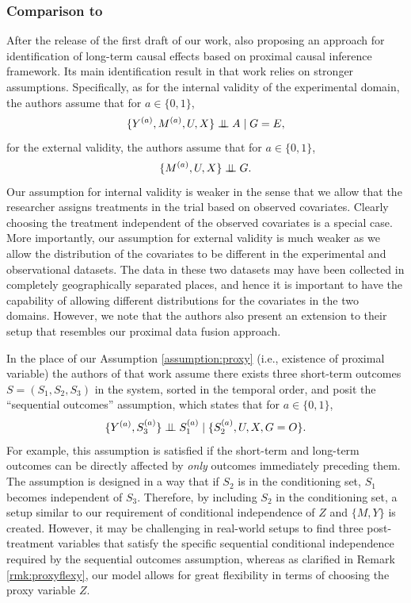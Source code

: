 \documentclass[10pt]{article}
\newcommand{\independent}{\perp\mkern-9.5mu\perp}
\begin{document}
\subsubsection{Comparison to \citep{imbens2022long}}
\label{sec:comImbens}

After the release of the first draft of our work, \cite{imbens2022long} also proposing an approach for identification of long-term causal effects based on proximal causal inference framework. Its main identification result in that work relies on stronger assumptions. Specifically, as for the internal validity of the experimental domain, the authors assume that for $a\in\{0,1\}$,
\[
\{Y^{(a)},M^{(a)},U,X\}\independent A\mid G=E,
\]
for the external validity, the authors assume that for $a\in\{0,1\}$,
\[
\{M^{(a)},U,X\}\independent G.
\]
Our assumption for internal validity is weaker in the sense that we allow that the researcher assigns treatments in the trial based on observed covariates. Clearly choosing the treatment independent of the observed covariates is a special case.
More importantly, our assumption for external validity is much weaker as we allow the distribution of the covariates to be different in the experimental and observational datasets. The data in these two datasets may have been collected in completely geographically separated places, and hence it is important to have the capability of allowing different distributions for the covariates in the two domains. 
However, we note that the authors also present an extension to their setup that resembles our proximal data fusion approach.  

In the place of our Assumption \ref{assumption:proxy} (i.e., existence of proximal variable) the authors of that work assume there exists three short-term outcomes $S=(S_1,S_2,S_3)$ in the system, sorted in the temporal order, and posit the ``sequential outcomes'' assumption, which states that for $a\in\{0,1\}$,
\[
\{Y^{(a)},S_3^{(a)}\}\independent S_1^{(a)}\mid \{S_2^{(a)},U,X,G=O\}.
\]
For example, this assumption is satisfied if the short-term and long-term outcomes can be directly affected by \emph{only} outcomes immediately preceding them.
The assumption is designed in a way that if $S_2$ is in the conditioning set, $S_1$ becomes independent of $S_3$. Therefore, by including $S_2$ in the conditioning set, a setup similar to our requirement of conditional independence of $Z$ and $\{M,Y\}$ is created.
However, it may be challenging in real-world setups to find three post-treatment variables that satisfy the specific sequential conditional independence required by the sequential outcomes assumption, whereas as clarified in Remark \ref{rmk:proxyflexy}, our model allows for great flexibility in terms of choosing the proxy variable $Z$.
\end{document}
